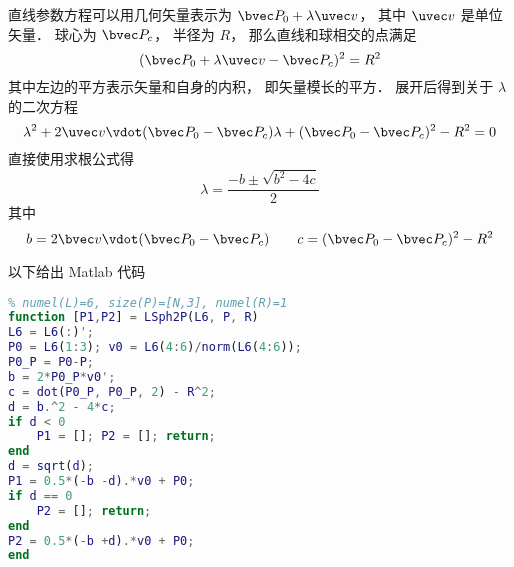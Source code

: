 

直线参数方程可以用几何矢量表示为 $\bvec P_0 + \lambda \uvec v$， 其中 $\uvec v$ 是单位矢量． 球心为 $\bvec P_c$， 半径为 $R$， 那么直线和球相交的点满足
\begin{equation}
(\bvec P_0 + \lambda \uvec v - \bvec P_c)^2 = R^2
\end{equation}
其中左边的平方表示矢量和自身的内积， 即矢量模长的平方． 展开后得到关于 $\lambda$ 的二次方程
\begin{equation}
\lambda^2 + 2\uvec v \vdot (\bvec P_0 - \bvec P_c) \lambda + (\bvec P_0 - \bvec P_c)^2 - R^2 = 0
\end{equation}
直接使用求根公式得
\begin{equation}
\lambda = \frac{-b \pm \sqrt{b^2 - 4c}}{2}
\end{equation}
其中
\begin{equation}
b = 2\bvec v \vdot (\bvec P_0 - \bvec P_c)
\qquad
c = (\bvec P_0 - \bvec P_c)^2 - R^2
\end{equation}

以下给出 Matlab 代码
\begin{lstlisting}[language=matlab]
% 计算直线和球的焦点
% numel(L)=6, size(P)=[N,3], numel(R)=1
function [P1,P2] = LSph2P(L6, P, R)
L6 = L6(:)';
P0 = L6(1:3); v0 = L6(4:6)/norm(L6(4:6));
P0_P = P0-P;
b = 2*P0_P*v0';
c = dot(P0_P, P0_P, 2) - R^2;
d = b.^2 - 4*c;
if d < 0
    P1 = []; P2 = []; return;
end
d = sqrt(d);
P1 = 0.5*(-b -d).*v0 + P0;
if d == 0
    P2 = []; return;
end
P2 = 0.5*(-b +d).*v0 + P0;
end
\end{lstlisting}
